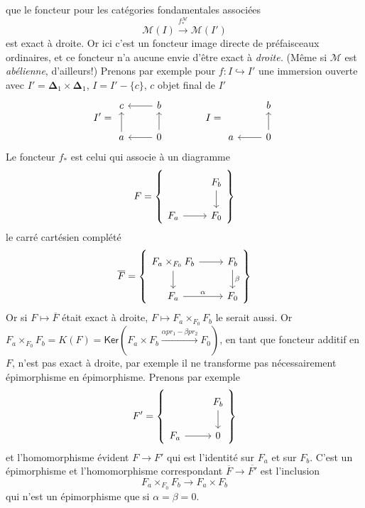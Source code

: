 que le foncteur pour les catégories fondamentales associées
\[ \mathcal{M}(I) \xrightarrow{f^{\mathcal{M}}_*} \mathcal{M}(I') \]
est exact à droite. Or ici c'est un foncteur image directe de préfaisceaux ordinaires, et ce foncteur n'a aucune envie d'être exact à \textit{droite.} (Même si $\mathcal{M}$ est \textit{abélienne}, d'ailleurs!) Prenons par exemple pour $f : I \hookrightarrow I'$ une immersion ouverte avec $I' = \boldsymbol{\Delta}_1 \times \boldsymbol{\Delta}_1$, $I = I' - \{c\}$, $c$ objet final de $I'$
\[
I' = \begin{tikzcd}
c & b \arrow[l] \\
a \arrow[u] & 0 \arrow[l] \arrow[u]
\end{tikzcd}
\qquad\qquad
I = \begin{tikzcd}
 & b \\
a & 0 \arrow[l] \arrow[u]
\end{tikzcd}
\]
Le foncteur $f_*$ est celui qui associe à un diagramme
\[
F = \left\{
\begin{tikzcd}
 & F_b \arrow[d] \\
F_a \arrow[r] & F_0
\end{tikzcd}
\right\}
\]
le carré cartésien complété
\[
\overline{F} = \left\{
\begin{tikzcd}
F_a \times_{F_0} F_b \arrow[r] \arrow[d] & F_b \arrow[d, "\beta"] \\
F_a \arrow[r, "\alpha"] & F_0
\end{tikzcd}
\right\}
\]
Or si $F \mapsto \overline{F}$ était exact à droite, $F \mapsto F_a \times_{F_0} F_b$ le serait aussi. Or $F_a \times_{F_0} F_b = K(F) = \mathsf{Ker}(F_a \times F_b \xrightarrow{\alpha pr_1 - \beta pr_2} F_0)$, en tant que foncteur additif en $F$, n'est pas exact à droite, par exemple il ne transforme pas nécessairement épimorphisme en épimorphisme. Prenons par exemple
\[
F' = \left\{
\begin{tikzcd}
 & F_b \arrow[d] \\
F_a \arrow[r] & 0
\end{tikzcd}
\right\}
\]
et l'homomorphisme évident $F \to F'$ qui est l'identité sur
$F_a$ et sur $F_b$. C'est un épimorphisme et l'homomorphisme correspondant $\overline{F} \to \overline{F'}$ est l'inclusion
\[ F_a \times_{F_0} F_b \longrightarrow F_a \times F_b \]
qui n'est un épimorphisme que si $\alpha = \beta = 0$.

